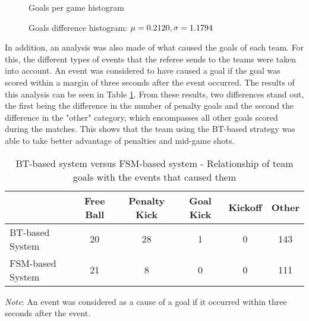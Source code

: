 \begin{figure}
    \begin{center}
        \scalebox{0.9} {
            
        }
    \end{center}
    \caption{Goals per game histogram}
    \label{fig:goals_diff_hist}
\end{figure}

\begin{figure}
    \begin{center}
        \scalebox{0.9} {
            
        }
    \end{center}
    \caption{Goals difference histogram: $\protect\mu = 0.2120, \sigma = 1.1794$}
    \label{fig:goals_per_game_hist}
\end{figure}

In addition, an analysis was also made of what caused the goals of each team. For this, the different types of events that the referee sends to the teams were taken into account. An event was considered to have caused a goal if the goal was scored within a margin of three seconds after the event occurred. The results of this analysis can be seen in Table \ref{tab:goals_reasons}. From these results, two differences stand out, the first being the difference in the number of penalty goals and the second the difference in the "other" category, which encompasses all other goals scored during the matches. This shows that the team using the BT-based strategy was able to take better advantage of penalties and mid-game shots.

\begin{table}[h]
    \begin{minipage}{\columnwidth}
        \centering
        \begin{tabular}{l c c c c c}
            \toprule
                             & Free Ball & Penalty Kick & Goal Kick & Kickoff & Other \\
            \midrule
            BT-based System  & 20        & 28           & 1         & 0       & 143   \\
            FSM-based System & 21        & 8            & 0         & 0       & 111   \\
            \bottomrule
        \end{tabular}
        \begin{center}
            \footnotesize
            \emph{Note}: An event was considered as a cause of a goal if it occurred within three seconds after the event.
        \end{center}
    \end{minipage}
    \caption{BT-based system versus FSM-based system - Relationship of team goals with the events that caused them}
    \label{tab:goals_reasons}
\end{table}

